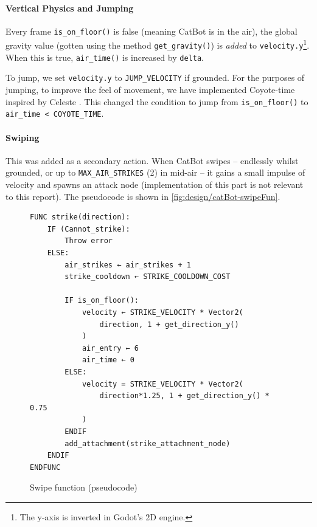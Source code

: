 \paragraph{Vertical Physics and Jumping}

Every frame \texttt{is\_on\_floor()} is false (meaning CatBot is in the air), the global gravity value (gotten using the method \texttt{get\_gravity()}) is \textit{added} to \texttt{velocity.y}\footnote{The y-axis is inverted in Godot's 2D engine.}. When this is true, \texttt{air\_time()} is increased by \texttt{delta}.

To jump, we set \texttt{velocity.y} to \texttt{JUMP\_VELOCITY} if grounded. For the purposes of jumping, to improve the feel of movement, we have implemented Coyote-time inspired by Celeste \citep{Celeste} \citep{GameRant-CoyoteTime}. This changed the condition to jump from \texttt{is\_on\_floor()} to \texttt{air\_time < COYOTE\_TIME}.

\paragraph{Swiping}

This was added as a secondary action. When CatBot swipes -- endlessly whilst grounded, or up to \texttt{MAX\_AIR\_STRIKES} (2) in mid-air -- it gains a small impulse of velocity and spawns an attack node (implementation of this part is not relevant to this report). The pseudocode is shown in \autoref{fig:design/catBot-swipeFun}.

\begin{figure}
    \begin{tcolorbox}[boxrule=0.25mm]
    \begin{verbatim}
FUNC strike(direction):
    IF (Cannot_strike):
        Throw error
    ELSE:
        air_strikes ← air_strikes + 1
        strike_cooldown ← STRIKE_COOLDOWN_COST

        IF is_on_floor():
            velocity ← STRIKE_VELOCITY * Vector2(
                direction, 1 + get_direction_y()
            )
            air_entry ← 6
            air_time ← 0
        ELSE:
            velocity = STRIKE_VELOCITY * Vector2(
                direction*1.25, 1 + get_direction_y() * 0.75
            )
        ENDIF
        add_attachment(strike_attachment_node)
    ENDIF
ENDFUNC
    \end{verbatim}
    \end{tcolorbox}
    \caption{Swipe function (pseudocode)}
    \label{fig:design/catBot-swipeFun}
\end{figure}

